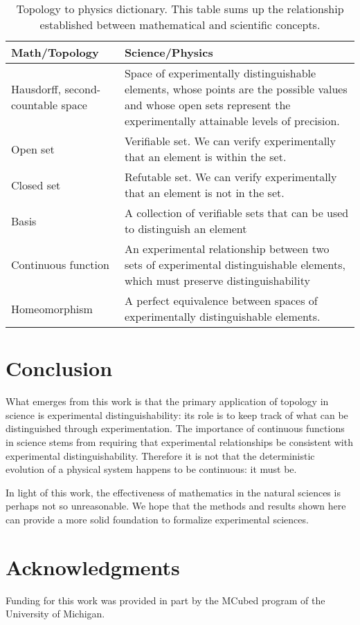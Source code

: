 \documentclass[preprint]{elsarticle}
\theoremstyle{plain}%
\theoremstyle{definition}
\theoremstyle{remark}
\begin{document}
\begin{table}[h]
	\centering
	\begin{tabular}{p{} p{}}
		Math/Topology & Science/Physics \\ 
		\hline 
		Hausdorff, second-countable space & Space of experimentally distinguishable elements, whose points are the possible values and whose open sets represent the experimentally attainable levels of precision. \\
		Open set & Verifiable set. We can verify experimentally that an element is within the set.  \\ 
		Closed set & Refutable set. We can verify experimentally that an element is not in the set. \\ 
		Basis & A collection of verifiable sets that can be used to distinguish an element\\
		Continuous \newline function &  An experimental relationship between two sets of experimental distinguishable elements, which must preserve distinguishability \\
		Homeomorphism &  A perfect equivalence between spaces of experimentally distinguishable elements. \\
	\end{tabular} 
	\caption{Topology to physics dictionary. This table sums up the relationship established between mathematical and scientific concepts.}
\end{table}


\section{Conclusion}

What emerges from this work is that the primary application of topology in science is experimental distinguishability: its role is to keep track of what can be distinguished through experimentation. The importance of continuous functions in science stems from requiring that experimental relationships be consistent with experimental distinguishability. Therefore it is not that the deterministic evolution of a physical system happens to be continuous: it must be.

In light of this work, the effectiveness of mathematics in the natural sciences is perhaps not so unreasonable. We hope that the methods and results shown here can provide a more solid foundation to formalize experimental sciences.

\section*{Acknowledgments}
Funding for this work was provided in part by the MCubed program of the University of Michigan.



\end{document}
